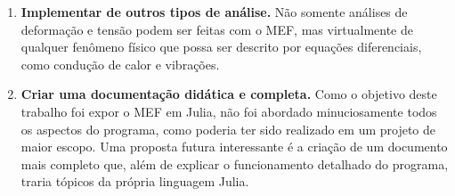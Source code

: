 \begin{enumerate}
    \item \textbf{Implementar de outros tipos de análise.} Não somente análises de deformação e tensão podem ser feitas com o MEF, mas virtualmente de qualquer fenômeno físico que possa ser descrito por equações diferenciais, como condução de calor e vibrações.
    \item \textbf{Criar uma documentação didática e completa.} Como o objetivo deste trabalho foi expor o MEF em Julia, não foi abordado minuciosamente todos os aspectos do programa, como poderia ter sido realizado em um projeto de maior escopo. Uma proposta futura interessante é a criação de um documento mais completo que, além de explicar o funcionamento detalhado do programa, traria tópicos da própria linguagem Julia.
\end{enumerate}

